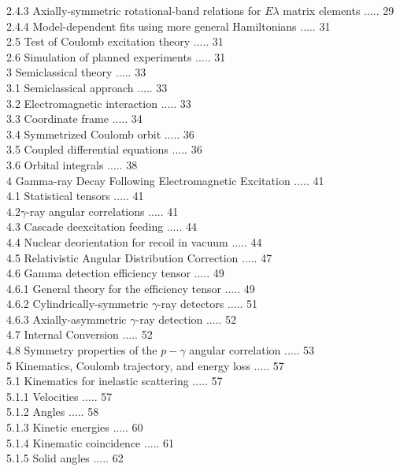 \documentclass[10pt]{article}
\begin{document}
2.4.3 Axially-symmetric rotational-band relations for $E \lambda$ matrix elements ..... 29\\
2.4.4 Model-dependent fits using more general Hamiltonians ..... 31\\
2.5 Test of Coulomb excitation theory ..... 31\\
2.6 Simulation of planned experiments ..... 31\\
3 Semiclassical theory ..... 33\\
3.1 Semiclassical approach ..... 33\\
3.2 Electromagnetic interaction ..... 33\\
3.3 Coordinate frame ..... 34\\
3.4 Symmetrized Coulomb orbit ..... 36\\
3.5 Coupled differential equations ..... 36\\
3.6 Orbital integrals ..... 38\\
4 Gamma-ray Decay Following Electromagnetic Excitation ..... 41\\
4.1 Statistical tensors ..... 41\\
$4.2 \gamma$-ray angular correlations ..... 41\\
4.3 Cascade deexcitation feeding ..... 44\\
4.4 Nuclear deorientation for recoil in vacuum ..... 44\\
4.5 Relativistic Angular Distribution Correction ..... 47\\
4.6 Gamma detection efficiency tensor ..... 49\\
4.6.1 General theory for the efficiency tensor ..... 49\\
4.6.2 Cylindrically-symmetric $\gamma$-ray detectors ..... 51\\
4.6.3 Axially-asymmetric $\gamma$-ray detection ..... 52\\
4.7 Internal Conversion ..... 52\\
4.8 Symmetry properties of the $p-\gamma$ angular correlation ..... 53\\
5 Kinematics, Coulomb trajectory, and energy loss ..... 57\\
5.1 Kinematics for inelastic scattering ..... 57\\
5.1.1 Velocities ..... 57\\
5.1.2 Angles ..... 58\\
5.1.3 Kinetic energies ..... 60\\
5.1.4 Kinematic coincidence ..... 61\\
5.1.5 Solid angles ..... 62\\
\end{document}
